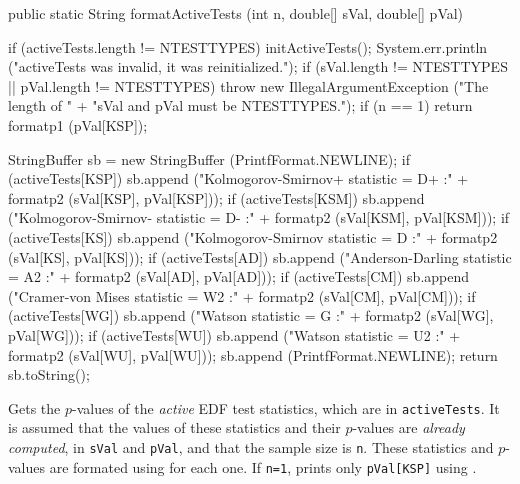 \begin{code}

   public static String formatActiveTests (int n, double[] sVal,
                                           double[] pVal)\begin{hide} {

      if (activeTests.length != NTESTTYPES) {
        initActiveTests();
        System.err.println ("activeTests was invalid, it was reinitialized.");
      }
      if (sVal.length != NTESTTYPES || pVal.length != NTESTTYPES)
        throw new IllegalArgumentException ("The length of " +
           "sVal and pVal must be NTESTTYPES.");
      if (n == 1)
         return formatp1 (pVal[KSP]);

      StringBuffer sb = new StringBuffer (PrintfFormat.NEWLINE);
      if (activeTests[KSP])
         sb.append ("Kolmogorov-Smirnov+ statistic = D+    :" +
           formatp2 (sVal[KSP], pVal[KSP]));
      if (activeTests[KSM])
         sb.append ("Kolmogorov-Smirnov- statistic = D-    :" +
           formatp2 (sVal[KSM], pVal[KSM]));
      if (activeTests[KS])
         sb.append ("Kolmogorov-Smirnov statistic  = D     :" +
           formatp2 (sVal[KS], pVal[KS]));
      if (activeTests[AD])
         sb.append ("Anderson-Darling statistic = A2       :" +
           formatp2 (sVal[AD], pVal[AD]));
      if (activeTests[CM])
         sb.append ("Cramer-von Mises statistic = W2       :" +
           formatp2 (sVal[CM], pVal[CM]));
      if (activeTests[WG])
         sb.append ("Watson statistic = G                  :" +
           formatp2 (sVal[WG], pVal[WG]));
      if (activeTests[WU])
         sb.append ("Watson statistic = U2                 :" +
           formatp2 (sVal[WU], pVal[WU]));
      sb.append (PrintfFormat.NEWLINE);
      return sb.toString();
   }\end{hide}
\end{code}
\begin{tabb} Gets the $p$-values of the {\em active\/} EDF test statistics,
  which are in \texttt{activeTests}.  It is assumed that the values
  of these statistics and their $p$-values are {\em already computed},
  in \texttt{sVal} and \texttt{pVal}, and that the sample size is \texttt{n}.
  These statistics and $p$-values are formated
  using  for each one.
  If \texttt{n=1}, prints only \texttt{pVal[KSP]} using .
\end{tabb}
